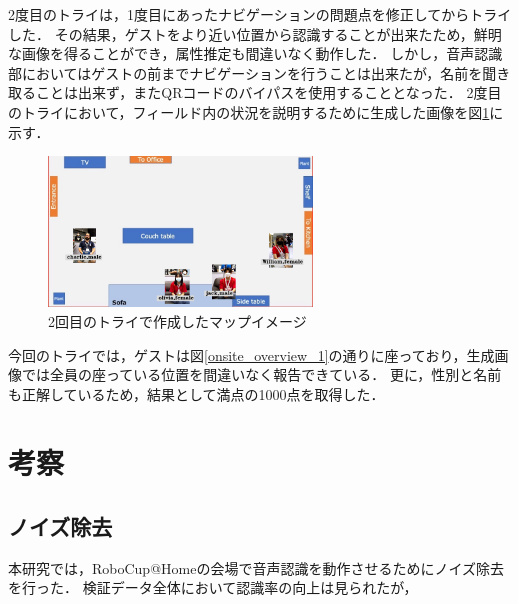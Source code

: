 \documentclass[a4j]{jarticle}
\begin{document}
2度目のトライは，1度目にあったナビゲーションの問題点を修正してからトライした．
その結果，ゲストをより近い位置から認識することが出来たため，鮮明な画像を得ることができ，属性推定も間違いなく動作した．
しかし，音声認識部においてはゲストの前までナビゲーションを行うことは出来たが，名前を聞き取ることは出来ず，またQRコードのバイパスを使用することとなった．
2度目のトライにおいて，フィールド内の状況を説明するために生成した画像を図\ref{result_FMM_2}に示す．
\begin{figure}[t]
  \centering
  \includegraphics[width=7cm]{images/FMM/mapimage.png}
  \caption{2回目のトライで作成したマップイメージ}
  \label{result_FMM_2}
\end{figure}
今回のトライでは，ゲストは図\ref{onsite_overview_1}の通りに座っており，生成画像では全員の座っている位置を間違いなく報告できている．
更に，性別と名前も正解しているため，結果として満点の1000点を取得した．


\section{考察}

\subsection{ノイズ除去}
本研究では，RoboCup@Homeの会場で音声認識を動作させるためにノイズ除去を行った．
検証データ全体において認識率の向上は見られたが，
\end{document}
